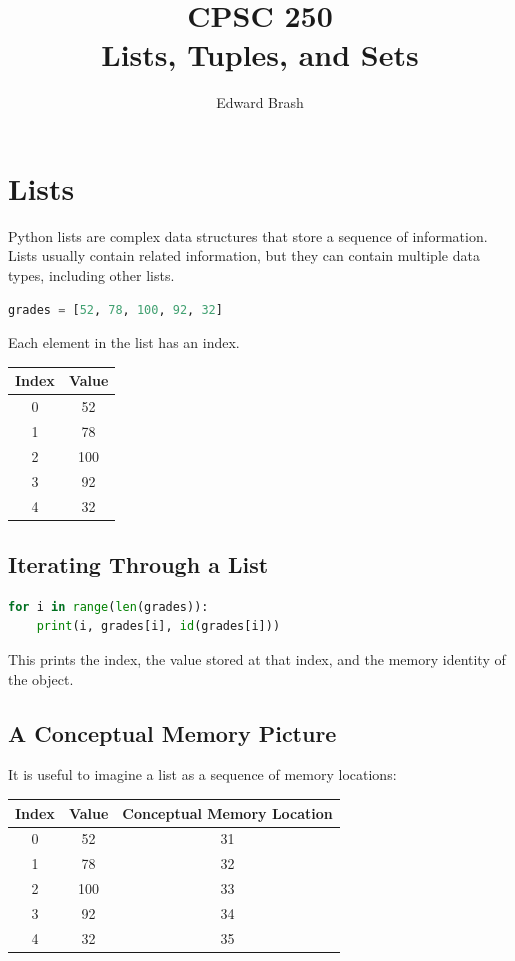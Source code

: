 \documentclass[11pt]{article}
\title{CPSC 250 \\ Lists, Tuples, and Sets}
\author{Edward Brash}
\date{}
\begin{document}
\maketitle

\section{Lists}

Python lists are complex data structures that store a sequence of information. Lists usually contain related information, but they can contain multiple data types, including other lists.

\begin{lstlisting}[language=Python]
grades = [52, 78, 100, 92, 32]
\end{lstlisting}

Each element in the list has an index.

\begin{center}
\begin{tabular}{|c|c|}
\hline
Index & Value \\
\hline
0 & 52 \\
1 & 78 \\
2 & 100 \\
3 & 92 \\
4 & 32 \\
\hline
\end{tabular}
\end{center}

\subsection{Iterating Through a List}

\begin{lstlisting}[language=Python]
for i in range(len(grades)):
    print(i, grades[i], id(grades[i]))
\end{lstlisting}

This prints the index, the value stored at that index, and the memory identity of the object.

\subsection{A Conceptual Memory Picture}

It is useful to imagine a list as a sequence of memory locations:

\begin{center}
\begin{tabular}{|c|c|c|}
\hline
Index & Value & Conceptual Memory Location \\
\hline
0 & 52 & 31 \\
1 & 78 & 32 \\
2 & 100 & 33 \\
3 & 92 & 34 \\
4 & 32 & 35 \\
\hline
\end{tabular}
\end{center}
\end{document}
